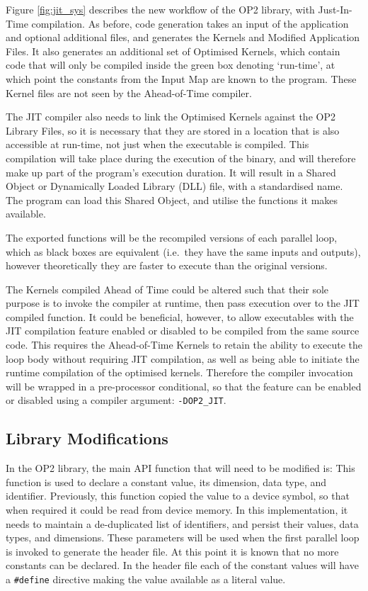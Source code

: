 \noindent Figure \ref{fig:jit_sys} describes the new workflow of the OP2 library, with Just-In-Time compilation. As before, code generation takes an input of the application and optional additional files, and generates the Kernels and Modified Application Files. It also generates an additional set of Optimised Kernels, which contain code that will only be compiled inside the green box denoting `run-time', at which point the constants from the Input Map are known to the program. These Kernel files are not seen by the Ahead-of-Time compiler.
\par
The JIT compiler also needs to link the Optimised Kernels against the OP2 Library Files, so it is necessary that they are stored in a location that is also accessible at run-time, not just when the executable is compiled. This compilation will take place during the execution of the binary, and will therefore make up part of the program's execution duration. It will result in a Shared Object or Dynamically Loaded Library (DLL) file, with a standardised name. The program can load this Shared Object, and utilise the functions it makes available.
\par
The exported functions will be the recompiled versions of each parallel loop, which as black boxes are equivalent (i.e.\ they have the same inputs and outputs), however theoretically they are faster to execute than the original versions.
\par
The Kernels compiled Ahead of Time could be altered such that their sole purpose is to invoke the compiler at runtime, then pass execution over to the JIT compiled function. It could be beneficial, however, to allow executables with the JIT compilation feature enabled or disabled to be compiled from the same source code. This requires the Ahead-of-Time Kernels to retain the ability to execute the loop body without requiring JIT compilation, as well as being able to initiate the runtime compilation of the optimised kernels. Therefore the compiler invocation will be wrapped in a pre-processor conditional, so that the feature can be enabled or disabled using a compiler argument: \verb|-DOP2_JIT|.

\subsection{Library Modifications}
In the OP2 library, the main API function that will need to be modified is:
\noindent This function is used to declare a constant value, its dimension, data type, and identifier.
Previously, this function copied the value to a device symbol, so that when required it could be read from device memory. In this implementation, it needs to maintain a de-duplicated list of identifiers, and persist their values, data types, and dimensions. These parameters will be used when the first parallel loop is invoked to generate the header file. At this point it is known that no more constants can be declared. In the header file each of the constant values will have a \verb|#define| directive making the value available as a literal value.

